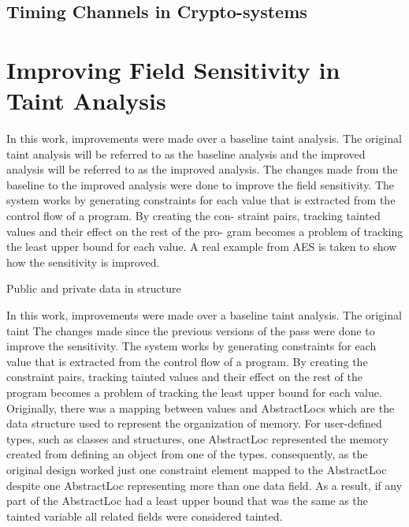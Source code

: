 \documentclass[11pt,a4paper]{article}
\begin{document}
\subsection{Timing Channels in Crypto-systems}

\section{Improving Field Sensitivity in Taint Analysis}
In this work, improvements were made over a baseline taint analysis. The
original taint analysis will be referred to as the baseline analysis and the
improved analysis will be referred to as the improved analysis. The changes
made from the baseline to the improved analysis were done to improve the
field sensitivity. The system works by generating constraints for each value
that is extracted from the control flow of a program. By creating the con-
straint pairs, tracking tainted values and their effect on the rest of the pro-
gram becomes a problem of tracking the least upper bound for each value.
A real example from AES is taken to show how the sensitivity is improved.

\begin{algorithm}
  \caption{Public and private data in structure}
  \label{alg:aes_struclt}
  
\end{algorithm}

  In this work, improvements were made over a baseline taint analysis. The
  original taint  
  The changes made since the previous versions of the pass were done to improve
  the sensitivity. The system works by generating constraints for each value that
  is extracted from the control flow of a program. By creating the constraint
  pairs, tracking tainted values and their effect on  the rest of the program
  becomes a problem of tracking the least upper bound for each value.  Originally,
  there was a mapping between values and AbstractLocs which are the data structure
  used to represent the organization of memory. For user-defined types, such as
  classes and structures, one AbstractLoc represented the memory created from
  defining an object from one of the types. consequently, as the original design
  worked just one constraint element mapped to the AbstractLoc despite one
  AbstractLoc representing more than one data field. As a result, if any part of
  the AbstractLoc had a least upper bound that was the same as the tainted
  variable all related fields were considered tainted.
\end{document}
